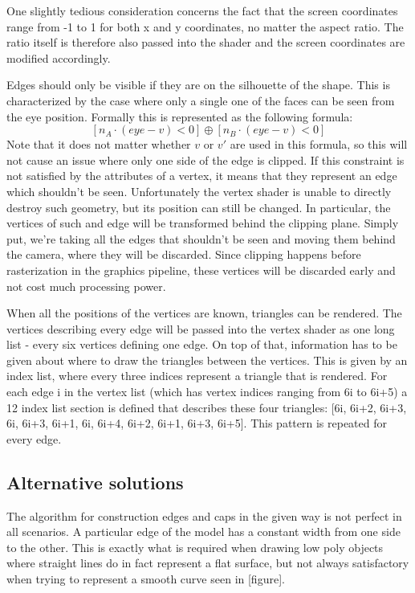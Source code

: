 \documentclass[a4paper, 12pt]{article}
\begin{document}
One slightly tedious consideration concerns the fact that the screen coordinates range from -1 to 1 for both x and y coordinates, no matter the aspect ratio. The ratio itself is therefore also passed into the shader and the screen coordinates are modified accordingly.

Edges should only be visible if they are on the silhouette of the shape. This is characterized by the case where only a single one of the faces can be seen from the eye position. Formally this is represented as the following formula:
$$[n_A \cdot (eye-v) < 0] \oplus [n_B \cdot (eye-v) < 0]$$
Note that it does not matter whether $v$ or $v'$ are used in this formula, so this will not cause an issue where only one side of the edge is clipped. If this constraint is not satisfied by the attributes of a vertex, it means that they represent an edge which shouldn't be seen. Unfortunately the vertex shader is unable to directly destroy such geometry, but its position can still be changed. In particular, the vertices of such and edge will be transformed behind the clipping plane. Simply put, we're taking all the edges that shouldn't be seen and moving them behind the camera, where they will be discarded. Since clipping happens before rasterization in the graphics pipeline, these vertices will be discarded early and not cost much processing power.

When all the positions of the vertices are known, triangles can be rendered. The vertices describing every edge will be passed into the vertex shader as one long list - every six vertices defining one edge. On top of that, information has to be given about where to draw the triangles between the vertices. This is given by an index list, where every three indices represent a triangle that is rendered. For each edge i in the vertex list (which has vertex indices ranging from 6i to 6i+5) a 12 index list section is defined that describes these four triangles: [6i, 6i+2, 6i+3, 6i, 6i+3, 6i+1, 6i, 6i+4, 6i+2, 6i+1, 6i+3, 6i+5]. This pattern is repeated for every edge.

\subsection{Alternative solutions}

The algorithm for construction edges and caps in the given way is not perfect in all scenarios. A particular edge of the model has a constant width from one side to the other. This is exactly what is required when drawing low poly objects where straight lines do in fact represent a flat surface, but not always satisfactory when trying to represent a smooth curve seen in [figure].
\end{document}
